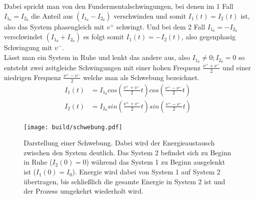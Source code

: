 Dabei spricht man von den Fundermentalschwingungen, bei denen im 1 Fall $I_{1_0}=I_{2_0}$ die Anteil  aus
$(I_{1_0}-I_{2_0})$ verschwinden und somit $I_1(t)=I_2(t)$ ist, also das System phasengleich mit $v^+$ schwingt. 
Und bei dem 2 Fall $I_{1_0}=-I_{2_0}$ verschwindet $(I_{1_0}+I_{2_0})$ es 
folgt somit $I_1(t)=-I_2(t)$, also gegenphasig Schwingung mit $v^-$.\\
Lässt man ein System in Ruhe und lenkt das andere aus, also $I_{1_0}\neq 0; I_{2_0}=0$
so entsteht zwei zeitgleiche Schwingungen mit einer hohen Frequenz $\frac{\nu^+ + \nu^-}{2}$
und einer niedrigen Frequenz $\frac{\nu^+ - \nu^-}{2}$ welche man als Schwebung bezeichnet.
\begin{align}
    I_1\left(t\right)&=I_{1_0}cos\left(\frac{\nu^+ + \nu^-}{2}t\right)cos\left(\frac{\nu^+ - \nu^-}{2}t\right)\\ 
    I_2\left(t\right)&=I_{2_0}sin\left(\frac{\nu^+ + \nu^-}{2}t\right)sin\left(\frac{\nu^+ - \nu^-}{2}t\right)
\end{align}
\begin{figure}[H]
    \centering
    \texttt{[image: build/schwebung.pdf]}
    \caption{
        Darstellung einer Schwebung. Dabei wird der Energieaustausch zwischen den System deutlich.
        Das System 2 befindet sich zu Beginn in Ruhe ($I_2(0)=0$) während das System 1 zu Beginn ausgelenkt ist
        ($I_1(0)=I_0$). Energie wird dabei von System 1 auf System 2 übertragen, bis schließlich die gesamte 
        Energie in System 2 ist und der Prozess umgekehrt wiederholt wird.
    }
\end{figure}


